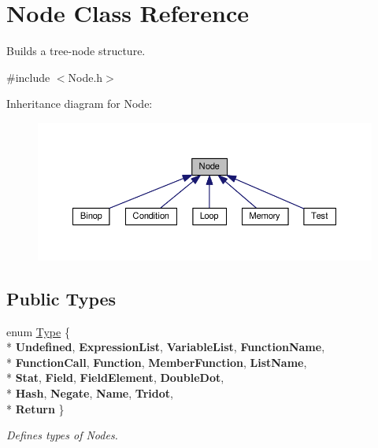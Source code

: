 \hypertarget{classNode}{}\section{Node Class Reference}
\label{classNode}


Builds a tree-\/node structure.  




{\ttfamily \#include $<$Node.\+h$>$}



Inheritance diagram for Node\+:\nopagebreak
\begin{figure}[H]
\begin{center}
\leavevmode
\includegraphics[width=350pt]{classNode__inherit__graph}
\end{center}
\end{figure}
\subsection*{Public Types}
\begin{DoxyCompactItemize}
\item 
enum \hyperlink{classNode_a8dad370be1595f49e0a7c2406a91e867}{Type} \{ \\*
{\bfseries Undefined}, 
{\bfseries Expression\+List}, 
{\bfseries Variable\+List}, 
{\bfseries Function\+Name}, 
\\*
{\bfseries Function\+Call}, 
{\bfseries Function}, 
{\bfseries Member\+Function}, 
{\bfseries List\+Name}, 
\\*
{\bfseries Stat}, 
{\bfseries Field}, 
{\bfseries Field\+Element}, 
{\bfseries Double\+Dot}, 
\\*
{\bfseries Hash}, 
{\bfseries Negate}, 
{\bfseries Name}, 
{\bfseries Tridot}, 
\\*
{\bfseries Return}
 \}
\begin{DoxyCompactList}\small\item\em Defines types of Nodes. \end{DoxyCompactList}\end{DoxyCompactItemize}
